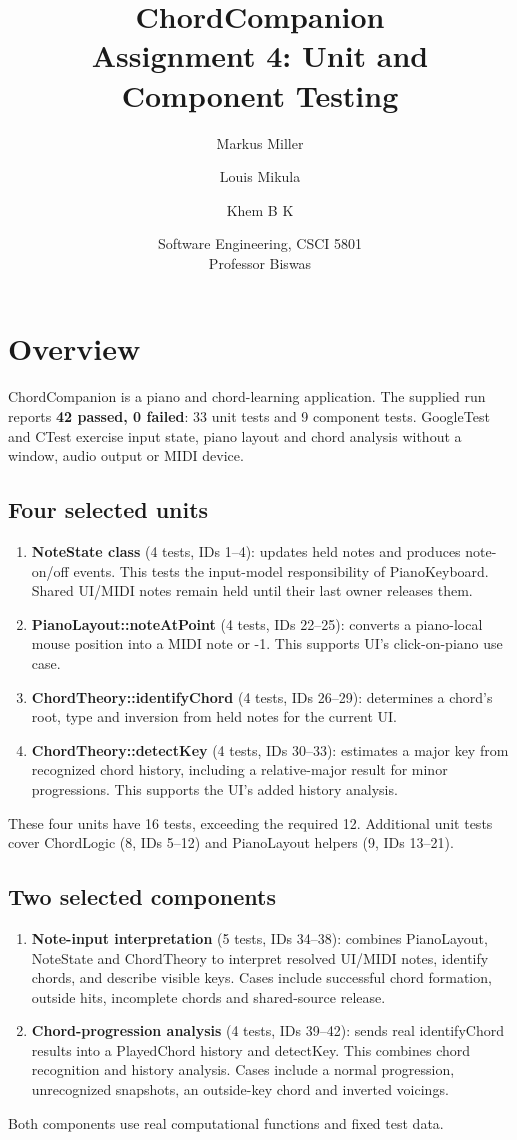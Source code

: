 \documentclass[10pt,letterpaper]{article}
\title{ChordCompanion\\Assignment 4: Unit and Component Testing}
\author{Markus Miller \and Louis Mikula \and Khem B K}
\date{Software Engineering, CSCI 5801\\Professor Biswas}
\begin{document}
\maketitle

\section{Overview}
ChordCompanion is a piano and chord-learning application. The supplied run
reports \textbf{42 passed, 0 failed}: 33 unit tests and 9 component tests.
GoogleTest and CTest exercise input state, piano layout and chord analysis
without a window, audio output or MIDI device.

\subsection{Four selected units}
\begin{enumerate}
\item \textbf{NoteState class} (4 tests, IDs 1--4): updates held notes and produces
note-on/off events. This tests the input-model responsibility of PianoKeyboard.
Shared UI/MIDI notes remain held until their last owner releases them.
\item \textbf{PianoLayout::noteAtPoint} (4 tests, IDs 22--25): converts a piano-local
mouse position into a MIDI note or -1. This supports UI's click-on-piano use case.
\item \textbf{ChordTheory::identifyChord} (4 tests, IDs 26--29): determines a chord's
root, type and inversion from held notes for the current UI.
\item \textbf{ChordTheory::detectKey} (4 tests, IDs 30--33): estimates a major key
from recognized chord history, including a relative-major result for minor
progressions. This supports the UI's added history analysis.
\end{enumerate}
These four units have 16 tests, exceeding the required 12. Additional unit tests
cover ChordLogic (8, IDs 5--12) and PianoLayout helpers (9, IDs 13--21).

\subsection{Two selected components}
\begin{enumerate}
\item \textbf{Note-input interpretation} (5 tests, IDs 34--38): combines PianoLayout,
NoteState and ChordTheory to interpret resolved UI/MIDI notes, identify chords,
and describe visible keys. Cases include successful chord formation, outside hits,
incomplete chords and shared-source release.
\item \textbf{Chord-progression analysis} (4 tests, IDs 39--42): sends real
identifyChord results into a PlayedChord history and detectKey. This combines
chord recognition and history analysis. Cases include a normal progression,
unrecognized snapshots, an outside-key chord and inverted voicings.
\end{enumerate}
Both components use real computational functions and fixed test data.
\end{document}
